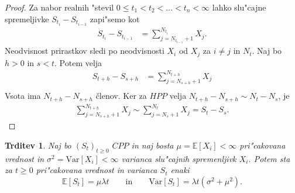 \documentclass[12pt, a4paper, reqno]{amsart}
\theoremstyle{definition}
\theoremstyle{plain}
\newtheorem{trditev}[definicija]{Trditev}
\newcommand{\E}{\mathbb{E}}
\newcommand{\1}{\mathds{1}}
\newcommand{\Var}[1]{\text{Var}\left[#1\right]}
\begin{document}
        \begin{proof}
            Za nabor realnih "stevil $0 \leq t_1 < t_2 < \ldots < t_n < \infty$ lahko slu"cajne
            spremeljivke $S_{t_i} - S_{t_{i-1}}$ zapi"semo kot
            \begin{align*}
                S_{t_i} - S_{t_{i-1}} &= \sum_{j=N_{t_{i-1}}+1}^{N_{t_i}} X_j. 
            \end{align*}
            Neodvisnost prirastkov sledi po neodvisnosti $X_i$ od $X_j$ za $i\neq j$ in $N_t$. 
            Naj bo $h > 0$ in $s < t$. Potem velja
            \begin{align*}
                S_{t+h} - S_{s+h} &= \sum_{j=N_{s+h}+1}^{N_{t+h}} X_j \\
            \end{align*}
            Vsota ima $N_{t+h} - N_{s+h}$ členov. Ker za $HPP$ velja 
            $N_{t+h} - N_{s+h} \sim N_t - N_s$, je 
            \begin{align*}
                \sum_{j=N_{s+h}+1}^{N_{t+h}} X_j \sim \sum_{j=N_{s}+1}^{N_{t}} X_j = S_t - S_s.
            \end{align*}
        \end{proof}

        \begin{trditev}
            Naj bo $(S_t)_{t\geq 0}$ $CPP$ in naj bosta $\mu = \E\left[X_i\right] < \infty$ 
            pri"cakovana vrednost in $\sigma^2= \Var{X_i} <\infty$ varianca
            slu"cajnih spremenljivk $X_i$. Potem sta za $t\geq0$ pri"cakovana vrednost in 
            varianca $S_t$ enaki 
            \begin{equation*}
                \E\left[S_t\right] = \mu\lambda t \qquad \text{in} \qquad \Var{S_t} = \lambda t\left(\sigma^2 + \mu^2\right).
            \end{equation*}
            \label{trd:PricVarCPP}
        \end{trditev}
\end{document}
